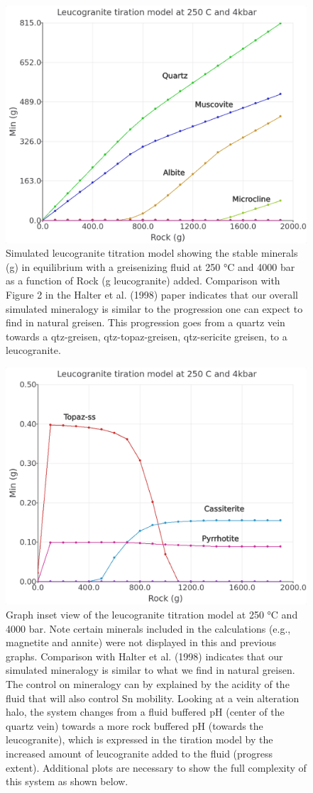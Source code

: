 \documentclass[
]{book}
\begin{document}
\begin{figure}
\includegraphics[width=0.8\linewidth]{figures/module3/fig-21} \caption{Simulated leucogranite titration model showing the stable minerals (g) in equilibrium with a greisenizing fluid at 250 °C and 4000 bar as a function of Rock (g leucogranite) added. Comparison with Figure 2 in the Halter et al. (1998) paper indicates that our overall simulated mineralogy is similar to the progression one can expect to find in natural greisen. This progression goes from a quartz vein towards a qtz-greisen, qtz-topaz-greisen, qtz-sericite greisen, to a leucogranite.}\label{fig:fig-21c}
\end{figure}
\begin{figure}
\includegraphics[width=0.8\linewidth]{figures/module3/fig-22} \caption{Graph inset view of the leucogranite titration model at 250 °C and 4000 bar. Note certain minerals included in the calculations (e.g., magnetite and annite) were not displayed in this and previous graphs. Comparison with Halter et al. (1998) indicates that our simulated mineralogy is similar to what we find in natural greisen. The control on mineralogy can by explained by the acidity of the fluid that will also control Sn mobility. Looking at a vein alteration halo, the system changes from a fluid buffered pH (center of the quartz vein) towards a more rock buffered pH (towards the leucogranite), which is expressed in the tiration model by the increased amount of leucogranite added to the fluid (progress extent). Additional plots are necessary to show the full complexity of this system as shown below.}\label{fig:fig-22c}
\end{figure}
\end{document}
